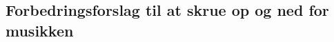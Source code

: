 \subsection{Forbedringsforslag til at skrue op og ned for musikken}
\label{TestresultaterVolumenForbedringer}